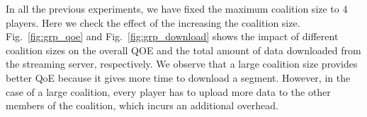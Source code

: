 In all the previous experiments, we have fixed the maximum coalition size to 4 players. Here we check the effect of the increasing the coalition size. Fig.~\ref{fig:grp_qoe} and Fig.~\ref{fig:grp_download} shows the impact of different coalition sizes on the overall QOE and the total amount of data downloaded from the streaming server, respectively. We observe that a large coalition size provides better QoE because it gives more time to download a segment. However, in the case of a large coalition, every player has to upload more data to the other members of the coalition, which incurs an additional overhead.

